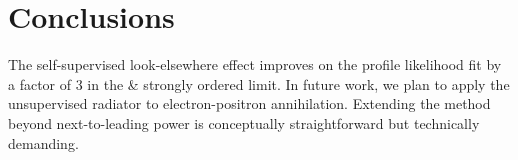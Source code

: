 \section{Conclusions}\label{sec:conclusions}

The self-supervised look-elsewhere effect improves on the profile
likelihood fit by a factor of 3 in the & strongly ordered limit. In future
work, we plan to apply the unsupervised radiator to electron-positron
annihilation. Extending the method beyond next-to-leading power is
conceptually straightforward but technically demanding.

